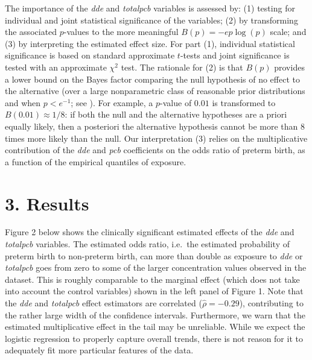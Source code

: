 \documentclass[10pt,]{article}
\begin{document}
The importance of the \emph{dde} and \emph{totalpcb} variables is
assessed by: (1) testing for individual and joint statistical
significance of the variables; (2) by transforming the associated
\(p\)-values to the more meaningful \(B(p) = -e p \log(p)\) scale; and
(3) by interpreting the estimated effect size. For part (1), individual
statistical significance is based on standard approximate \(t\)-tests
and joint significance is tested with an approximate \(\chi^2\) test.
The rationale for (2) is that \(B(p)\) provides a lower bound on the
Bayes factor comparing the null hypothesis of no effect to the
alternative (over a large nonparametric class of reasonable prior
distributions and when \(p < e^{-1}\); see \citet{Sellke2001}). For
example, a \(p\)-value of \(0.01\) is transformed to
\(B(0.01) \approx 1/8\): if both the null and the alternative hypotheses
are a priori equally likely, then a posteriori the alternative
hypothesis cannot be more than 8 times more likely than the null. Our
interpretation (3) relies on the multiplicative contribution of the
\emph{dde} and \emph{pcb} coefficients on the odds ratio of preterm
birth, as a function of the empirical quantiles of exposure.

\hypertarget{results}{%
\section{3. Results}\label{results}}

Figure 2 below shows the clinically significant estimated effects of the
\emph{dde} and \emph{totalpcb} variables. The estimated odds ratio,
i.e.~the estimated probability of preterm birth to non-preterm birth,
can more than double as exposure to \emph{dde} or \emph{totalpcb} goes
from zero to some of the larger concentration values observed in the
dataset. This is roughly comparable to the marginal effect (which does
not take into account the control variables) shown in the left panel of
Figure 1. Note that the \emph{dde} and \emph{totalpcb} effect estimators
are correlated (\(\hat \rho = -0.29\)), contributing to the rather large
width of the confidence intervals. Furthermore, we warn that the
estimated multiplicative effect in the tail may be unreliable. While we
expect the logistic regression to properly capture overall trends, there
is not reason for it to adequately fit more particular features of the
data.
\end{document}
